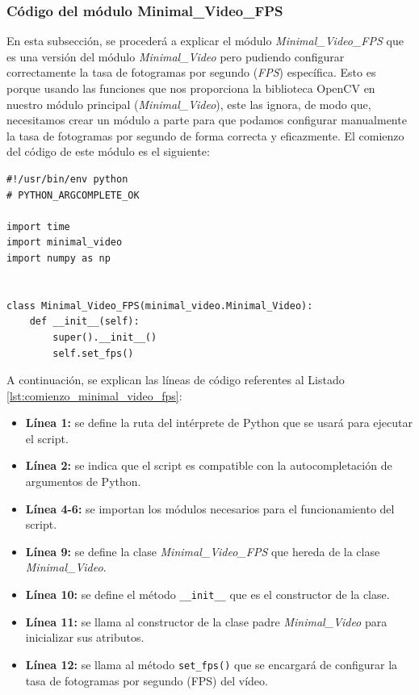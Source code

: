 \subsubsection{Código del módulo Minimal\_Video\_FPS}
En esta subsección, se procederá a explicar el módulo \textit{Minimal\_Video\_FPS} que es una versión del módulo \textit{Minimal\_Video} pero pudiendo configurar correctamente la tasa de fotogramas por segundo (\textit{FPS}) específica. Esto es porque usando las funciones que nos proporciona la biblioteca OpenCV en nuestro módulo principal (\textit{Minimal\_Video}), este las ignora, de modo que, necesitamos crear un módulo a parte para que podamos configurar manualmente la tasa de fotogramas por segundo de forma correcta y eficazmente. El comienzo del código de este módulo es el siguiente:

\begin{lstlisting}[style=pythonstyle, caption={Comienzo del módulo Minimal\_Video\_FPS y su inicialización.}, label={lst:comienzo_minimal_video_fps}]
#!/usr/bin/env python
# PYTHON_ARGCOMPLETE_OK

import time
import minimal_video
import numpy as np


class Minimal_Video_FPS(minimal_video.Minimal_Video):
    def __init__(self):
        super().__init__()
        self.set_fps()

\end{lstlisting}
\vspace{\baselineskip}

A continuación, se explican las líneas de código referentes al Listado \ref{lst:comienzo_minimal_video_fps}:
\begin{itemize}
    \item \textbf{Línea 1:} se define la ruta del intérprete de Python que se usará para ejecutar el script.
    \item \textbf{Línea 2:} se indica que el script es compatible con la autocompletación de argumentos de Python.
    \item \textbf{Línea 4-6:} se importan los módulos necesarios para el funcionamiento del script.
    \item \textbf{Línea 9:} se define la clase \textit{Minimal\_Video\_FPS} que hereda de la clase \textit{Minimal\_Video}.
    \item \textbf{Línea 10:} se define el método \texttt{\_\_init\_\_} que es el constructor de la clase.
    \item \textbf{Línea 11:} se llama al constructor de la clase padre \textit{Minimal\_Video} para inicializar sus atributos.
    \item \textbf{Línea 12:} se llama al método \texttt{set\_fps()} que se encargará de configurar la tasa de fotogramas por segundo (FPS) del vídeo.
\end{itemize}
\vspace{\baselineskip}

